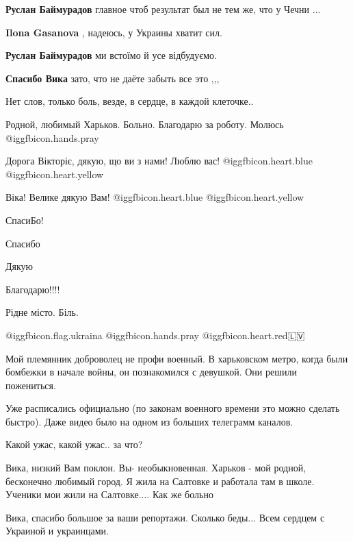 \begin{itemize}
\begin{itemize} %
\textbf{Руслан Баймурадов} главное чтоб результат был не тем же, что у Чечни ...

\textbf{Ilona Gasanova} , надеюсь, у Украины хватит сил.

\textbf{Руслан Баймурадов} ми встоїмо й усе відбудуємо.
\end{itemize} %

\textbf{Спасибо Вика} зато, что не даёте забыть все это ,,,

Нет слов, только боль, везде, в сердце, в каждой клеточке..

Родной, любимый Харьков. Больно. Благодарю за роботу. Молюсь @igg{fbicon.hands.pray} 

Дорога Вікторіє, дякую, що ви з нами! Люблю вас! @igg{fbicon.heart.blue}  @igg{fbicon.heart.yellow} 

Віка! Велике дякую Вам!  @igg{fbicon.heart.blue}  @igg{fbicon.heart.yellow} 

СпасиБо!

Спасибо

Дякую

Благодарю!!!!

Рідне місто. Біль.

 @igg{fbicon.flag.ukraina} @igg{fbicon.hands.pray} @igg{fbicon.heart.red}🇱🇻


Мой племянник доброволец не профи военный. В харьковском метро, когда были
бомбежки в начале войны, он познакомился с девушкой. Они решили пожениться.

Уже расписались официально (по законам военного времени это можно сделать
быстро). Даже видео было на одном из больших телеграмм каналов.

Какой ужас, какой ужас.. за что?


Вика, низкий Вам поклон. Вы- необыкновенная. Харьков - мой родной, бесконечно
любимый город. Я жила на Салтовке и работала там в школе. Ученики мои жили на
Салтовке.... Как же больно


Вика, спасибо большое за ваши репортажи. Сколько беды... Всем сердцем с
Украиной и украинцами.


\end{itemize}
